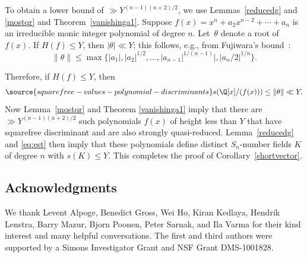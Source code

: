To obtain a lower bound of $\gg Y^{(n-1)(n+2)/2}$, we use
Lemmas~\ref{reducedg} and \ref{mostqr} and
Theorem~\ref{vanishinga1}. Suppose $f(x)=x^n + a_2x^{n-2} + \cdots +
a_n$ is an irreducible monic integer polynomial of degree $n$.
Let~$\theta$ denote a root of $f(x)$.
If $H(f)\leq Y$, then $|\theta|\ll Y$;
this follows, e.g., from Fujiwara's bound~\cite{Fujiwara}:
$$ \|\theta\|\leq  \max\{ |a_1|,|a_2|^{1/2},\ldots,|a_{n-1}|^{1/(n-1)}|, |a_n/2|^{1/n}\}.$$

Therefore, if $H(f)\leq Y$, then
\begin{equation}\label{eq:est}
\source{squarefree-values-polynomial-discriminants}
s(\Q[x]/(f(x))) \leq \|\theta\| \ll Y.
\end{equation}
Now Lemma~\ref{mostqr} and Theorem \ref{vanishinga1} imply that there are
$\gg Y^{(n-1)(n+2)/2}$ such polynomials $f(x)$ of height less than $Y$ that have squarefree discriminant and are also strongly
quasi-reduced. Lemma~\ref{reducedg} and \eqref{eq:est} then imply that
these polynomials define distinct $S_n$-number fields $K$ of degree $n$ with
$s(K)\leq Y$. This completes the proof of Corollary~\ref{shortvector}.



\subsection*{Acknowledgments}

We thank Levent Alpoge, Benedict Gross, Wei Ho, Kiran Kedlaya, Hendrik
Lenstra, Barry Mazur, Bjorn Poonen, Peter Sarnak, and Ila Varma for
their kind interest and many helpful conversations.  The first and third
authors were supported by a Simons Investigator Grant and NSF Grant DMS-1001828.
